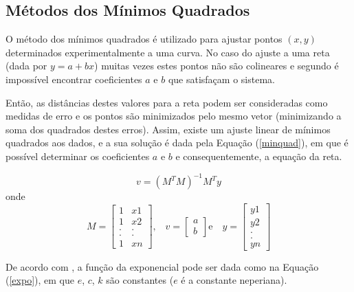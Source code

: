 {	\subsection{Métodos dos Mínimos Quadrados}
	\label{metminqua}

	O método dos mínimos quadrados é utilizado para ajustar pontos $(x,y)$ determinados experimentalmente a uma curva. No caso do ajuste a uma reta (dada por $y = a + bx$) muitas vezes estes pontos não são colineares e segundo \cite{minq} é impossível encontrar coeficientes $a$ e $b$ que satisfaçam o sistema.

	 Então, as distâncias destes valores para a reta podem ser consideradas como medidas de erro e os pontos são minimizados pelo mesmo vetor (minimizando a soma dos quadrados destes erros).  Assim, existe um ajuste linear de mínimos quadrados aos dados, e a sua solução é dada pela Equação (\ref{minquad}), em que é possível determinar os coeficientes $a$ e $b$ e consequentemente, a equação da reta. 

	\begin{equation}
		v =( M^{T}M)^{-1}M^{T}y
	\label{minquad}
	\end{equation}
	onde
	\begin{equation}
	M = \left[\begin{array}{cc}
               	1 & x1 \\
               	1 & x2  \\
		. & .  \\
               	. & .  \\
		1 & xn
          	         \end{array}\right] \mbox{,} \quad
	v = \left[\begin{array}{c}
               	a \\
               	b  
          	         \end{array}\right] \mbox{e} \quad
	y = \left[\begin{array}{c}
               	y1 \\
               	y2  \\
		.   \\
               	.   \\
		yn
          	         \end{array}\right] 	
	\label{variaveis}
	\end{equation}

	De acordo com \cite{calculo}, a função da exponencial pode ser dada como na Equação (\ref{expo}), em que $e$, $c$, $k$ são constantes ($e$ é a constante neperiana).  

}
